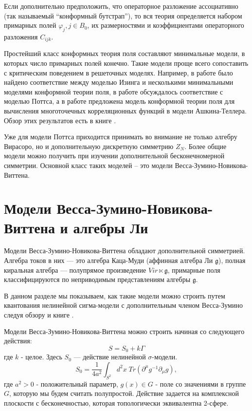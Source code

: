Если дополнительно предположить, что операторное разложение ассоциативно (так называемый ``конформный бутстрап''), то вся теория определяется набором примарных полей $\varphi_{j}, j\in B_{0}$, их размерностями и коэффициентами операторного разложения $C_{ijk}$.

Простейший класс конформных теория поля составляют минимальные модели, в которых число примарных полей конечно. Такие модели проще всего сопоставить с критическим поведением в решеточных моделях. Например, в работе \cite{belavin1984ics} было найдено соответствие между моделью Изинга и несколькими минимальными моделями конформной теории поля, в работе \cite{zamolodchikov1987representations} обсуждалось соответствие с моделью Поттса, а в работе \cite{zamolodchikov1987conformal} предложена модель конформной теории поля для вычисления многоточечных корреляционных функций в модели Ашкина-Теллера. Обзор этих результатов есть в книге \cite{difrancesco1997cft}.

 Уже для модели Поттса приходится принимать во внимание не только алгебру Вирасоро, но и дополнительную дискретную симметрию $Z_{N}$. Более общие модели можно получить при изучении дополнительной бесконечномерной симметрии. Основной класс таких моделей -- это модели Весса-Зумино-Новикова-Виттена. 


\section{Модели Весса-Зумино-Новикова-Виттена и алгебры Ли}
\label{sec:WZNW-models}

Модели Весса-Зумино-Новикова-Виттена обладают дополнительной симметрией. Алгебра токов в них --- это алгебра Каца-Муди
(аффинная алгебра Ли $\mathfrak{g}$), полная киральная алгебра --- полупрямое произведение
$Vir\ltimes \mathfrak{g}$, примарные поля классифицируются по неприводимым представлениям алгебры $\mathfrak{g}$.

В данном разделе мы показываем, как такие модели можно строить путем квантования нелинейной сигма-модели с дополнительным членом Весса-Зумино следуя обзору \cite{Walton:1999xc} и книге \cite{difrancesco1997cft}. 

Модели Весса-Зумино-Новикова-Виттена можно строить начиная со следующего действия:
\begin{equation}
\label{eq:4}
  S=S_0+k\Gamma
\end{equation}
где $k$ - целое.
Здесь $S_0$ --- действие нелинейной $\sigma$-модели.
\begin{equation}
  \label{eq:5}
  S_0=\frac{1}{4a^2}\int_{S^2} d^2x\; Tr (\partial^{\mu}g^{-1}\partial_{\mu}g),
\end{equation}
где $a^2>0$ - положительный параметр, $g(x)\in G$ - поле со значениями в группе $G$, которую мы
будем считать полупростой. Действие задается на комплексной плоскости с бесконечностью, которая
топологически эквивалентна 2-сфере.

